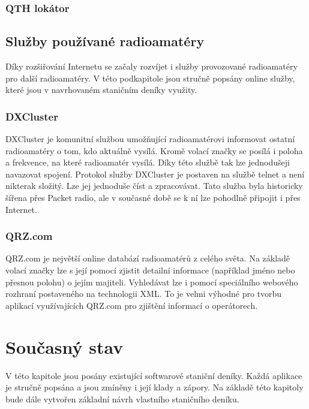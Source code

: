\subsection{QTH lokátor}

\section{Služby používané radioamatéry}
\label{radioamateri_sluzby}

Díky rozšiřování Internetu se začaly rozvíjet i služby provozované radioamatéry pro další radioamatéry. V této podkapitole
jsou stručně popsány online služby, které jsou v navrhovaném staničním deníky využity.

\subsection{DXCluster}

DXCluster je komunitní službou umožňující radioamatérovi informovat ostatní
radioamatéry o tom, kdo aktuálně vysílá. Kromě
volací značky se posílá i poloha a frekvence, na které radioamatér vysílá. Díky této službě tak lze jednodušeji navazovat
spojení. Protokol služby DXCluster je postaven na službě telnet a není nikterak
složitý. Lze jej jednoduše číst a zpracovávat. Tato služba byla historicky
šířena přes Packet radio, ale v současné době se k ní lze pohodlně připojit i přes
Internet.

\subsection{QRZ.com}

QRZ.com je největší online databází radioamatérů z celého světa. Na základě volací značky lze s její pomocí zjistit detailní
informace (například jméno nebo přesnou polohu) o jejím majiteli. Vyhledávat lze i pomocí speciálního webového rozhraní
postaveného na technologii XML. To je velmi výhodné pro tvorbu aplikací využívajících QRZ.com pro zjištění informací o
operátorech.

\chapter{Současný stav}
\label{soucasnost}

V této kapitole jsou posány existující softwarové staniční deníky. Každá aplikace je stručně
popsána a jsou zmíněny i její klady a zápory. Na základě této kapitoly bude dále
vytvořen základní návrh vlastního staničního deníku.


